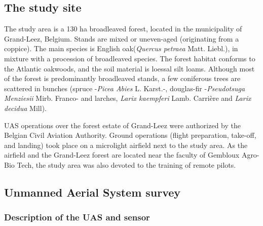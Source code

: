\documentclass[remotesensing,article,submit,moreauthors,pdftex,12pt,a4paper]{mdpi} %
\begin{document}
\subsection{The study site}

The study area is a 130 ha broadleaved forest, located in the municipality of Grand-Leez, Belgium. 
Stands are mixed or uneven-aged (originating from a coppice). 
The main species is English oak(\textit{Quercus petraea} Matt. Liebl.), in mixture with a procession of broadleaved species. 
The forest habitat conforms to the Atlantic oakwoods, and the soil material is loessal silt loams. 
Although most of the forest is predominantly broadleaved stands, a few coniferous trees are scattered in bunches (spruce -\textit{Picea Abies} L. Karst.-, douglas-fir -\textit{Pseudotsuga Menziesii} Mirb. Franco- and larches, \textit{Larix kaempferi} Lamb. Carrière and \textit{Larix decidua} Mill).

UAS operations over the forest estate of Grand-Leez were authorized by the Belgian Civil Aviation Authority. 
Ground operations (flight preparation, take-off, and landing) took place on a microlight airfield next to the study area. 
As the airfield and the Grand-Leez forest are located near the faculty of Gembloux Agro-Bio Tech, the study area was also devoted to the training of remote pilots. 


\subsection{Unmanned Aerial System survey}

\subsubsection{Description of the UAS and sensor}
\end{document}
